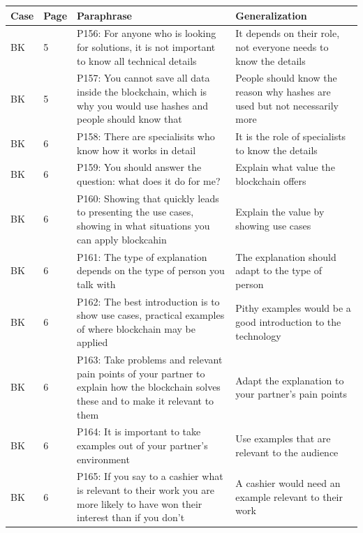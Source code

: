 \begin{table}[H]
    \centering
    \begin{tabularx}{\textwidth}{ll|X|p{4.5cm}}
	Case & Page & Paraphrase & Generalization \\ \hline
	BK & 5 & P156: For anyone who is looking for solutions, it is not important to know all technical details & It depends on their role, not everyone needs to know the details \\  
	BK & 5 & P157: You cannot save all data inside the blockchain, which is why you would use hashes and people should know that  & People should know the reason why hashes are used but not necessarily more \\  
	BK & 6 & P158: There are specialisits who know how it works in detail & It is the role of specialists to know the details \\  
	BK & 6 & P159: You should answer the question: what does it do for me? & Explain what value the blockchain offers \\  
	BK & 6 & P160: Showing that quickly leads to presenting the use cases, showing in what situations you can apply blockcahin & Explain the value by showing use cases \\  
	BK & 6 & P161: The type of explanation depends on the type of person you talk with & The explanation should adapt to the type of person \\  
	BK & 6 & P162: The best introduction is to show use cases, practical examples of where blockchain may be applied & Pithy examples would be a good introduction to the technology \\  
	BK & 6 & P163: Take problems and relevant pain points of your partner to explain how the blockchain solves these and to make it relevant to them & Adapt the explanation to your partner's pain points \\  
	BK & 6 & P164: It is important to take examples out of your partner's environment & Use examples that are relevant to the audience \\  
	BK & 6 & P165: If you say to a cashier what is relevant to their work you are more likely to have won their interest than if you don't & A cashier would need an example relevant to their work \\ 
\end{tabularx}
\end{table}

